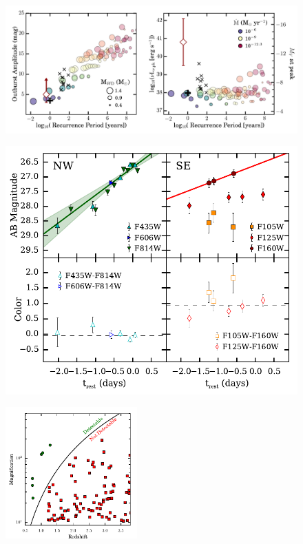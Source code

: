 \begin{figure}[tbp]
  \begin{center}
    \includegraphics[width=\textwidth]{recurrent_nova_recurrence_comparison}
    \caption{\protect}
  \end{center}
\end{figure}

\begin{figure}[tbp]
  \begin{center}
    \includegraphics[width=\textwidth]{spock_colorcurves_observerframe}
    \caption{\protect}
  \end{center}
\end{figure}

\begin{figure}[tbp]
  \begin{center}
    \includegraphics[width=0.45\textwidth]{hff_lensed_galaxies}
    \caption{\protect}
  \end{center}
\end{figure}







